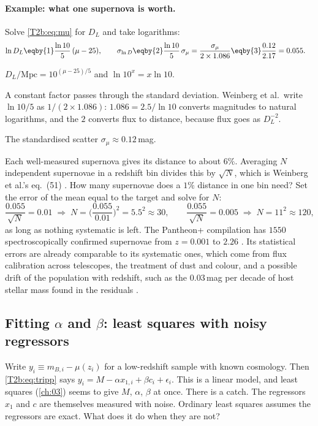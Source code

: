 \paragraph{Example: what one supernova is worth.}
Solve \eqref{T2b:eq:mu} for $D_L$ and take logarithms:
\begin{align}
  \ln D_L&\eqby{1}\frac{\ln10}{5}\,(\mu-25),\qquad
  \sigma_{\ln D}\eqby{2}\frac{\ln10}{5}\,\sigma_\mu=\frac{\sigma_\mu}{2\times1.086}
  \eqby{3}\frac{0.12}{2.17}=0.055 .
\end{align}
\begin{explain}
  \item $D_L/\mathrm{Mpc}=10^{(\mu-25)/5}$ and $\ln10^x=x\ln10$.
  \item A constant factor passes through the standard deviation. Weinberg et al.\ write $\ln10/5$ as $1/(2\times1.086)$: $1.086=2.5/\ln10$ converts magnitudes to natural logarithms, and the $2$ converts flux to distance, because flux goes as $D_L^{-2}$.
  \item The standardised scatter $\sigma_\mu\approx0.12$\,mag.
\end{explain}
Each well-measured supernova gives its distance to about $6\%$. Averaging $N$ independent supernovae in a redshift bin divides this by $\sqrt N$, which is Weinberg et al.'s eq.~(51) \cite[p.~34]{Weinberg2013}. How many supernovae does a $1\%$ distance in one bin need? Set the error of the mean equal to the target and solve for $N$:
\[
  \frac{0.055}{\sqrt N}=0.01\;\Longrightarrow\;N=\Big(\frac{0.055}{0.01}\Big)^2=5.5^2\approx30,
  \qquad
  \frac{0.055}{\sqrt N}=0.005\;\Longrightarrow\;N=11^2\approx120 ,
\]
as long as nothing systematic is left. The Pantheon+ compilation has $1550$ spectroscopically confirmed supernovae from $z=0.001$ to $2.26$ \cite{Brout2022PantheonPlus}. Its statistical errors are already comparable to its systematic ones, which come from flux calibration across telescopes, the treatment of dust and colour, and a possible drift of the population with redshift, such as the $0.03$\,mag per decade of host stellar mass found in the residuals \cite[pp.~39--41]{Weinberg2013}.

\subsection{Fitting \texorpdfstring{$\alpha$}{alpha} and \texorpdfstring{$\beta$}{beta}: least squares with noisy regressors}

Write $y_i\equiv m_{B,i}-\mu(z_i)$ for a low-redshift sample with known cosmology. Then \eqref{T2b:eq:tripp} says $y_i=M-\alpha x_{1,i}+\beta c_i+\epsilon_i$. This is a linear model, and least squares (\cref{ch:03}) seems to give $M$, $\alpha$, $\beta$ at once. There is a catch. The regressors $x_1$ and $c$ are themselves measured with noise. Ordinary least squares assumes the regressors are exact. What does it do when they are not?


